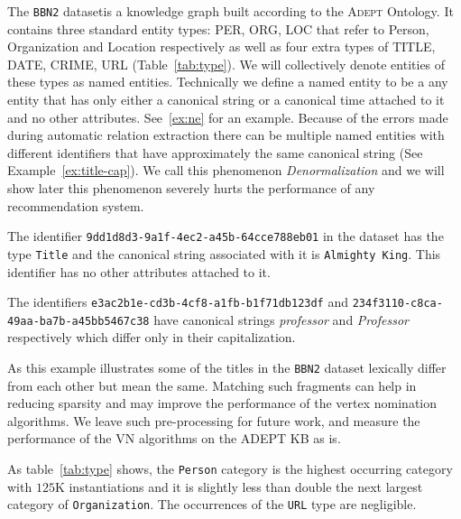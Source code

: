 \documentclass[paper=a4,fontsize=11pt]{scrartcl}
\newcommand{\tabref}[1]{table~\ref{#1}}
\newcommand{\Tabref}[1]{Table~\ref{#1}}
\newcommand{\Exref}[1]{Example~\ref{#1}}
\numberwithin{equation}{section}    %
\numberwithin{figure}{section}      %
\numberwithin{table}{section}       %
\newcommand{\dataset}[0]{\texttt{BBN2} dataset\xspace{}}
\newcommand{\ontology}{\textsc{Adept} Ontology\xspace{}}
\begin{document}
The \dataset is a knowledge graph built according to the \ontology.
It contains three standard entity types: \textsc{PER, ORG, LOC}
that refer to Person, Organization and Location respectively as well
as four extra types of \textsc{TITLE, DATE, CRIME, URL} (\Tabref{tab:type}).
We will collectively denote entities
of these types as named entities. Technically we define a named entity to be a
any entity that has only either a canonical string
or a canonical time attached to it and no other attributes.
See~\ref{ex:ne}  for an example.
Because of the errors made during automatic relation extraction there can be multiple
named entities with different identifiers that have approximately the same canonical string
(See \Exref{ex:title-cap}). We call this phenomenon \textit{Denormalization} and we will show
later this phenomenon severely hurts the performance of any recommendation system.
\begin{example}\label{ex:ne}
  The identifier \texttt{9dd1d8d3-9a1f-4ec2-a45b-64cce788eb01} in the dataset has
the type \texttt{Title}
and the canonical string associated with it is \texttt{Almighty King}. This
identifier has no other attributes attached to it.
\end{example}
\begin{example}\label{ex:title-cap}
  The identifiers \texttt{e3ac2b1e-cd3b-4cf8-a1fb-b1f71db123df} and
  \texttt{234f3110-c8ca-49aa-ba7b-a45bb5467c38} have canonical strings \textit{professor} and
  \textit{Professor} respectively which differ only in their capitalization.

  As this example illustrates some of the titles in the \dataset
  lexically differ from each other but mean the same. Matching such fragments
  can help in reducing sparsity and may improve the performance of the vertex
  nomination algorithms. We leave such pre-processing for future work, and
  measure the performance of the VN algorithms on the ADEPT KB as is.
\end{example}
As \tabref{tab:type} shows, the \texttt{Person} category is the highest occurring
category with $125$K instantiations
and it is slightly less than double the next largest category of \texttt{Organization}.
The occurrences of the \texttt{URL} type are negligible.
\end{document}
